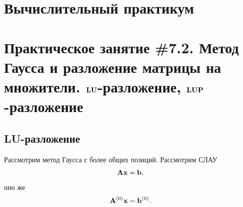 \documentclass[12pt]{article}
\begin{document}
    \begin{flushright}
    \end{flushright}
    \begin{flushright}
    \end{flushright}
    \section*{Вычислительный практикум}
    \section*{Практическое занятие \#7.2. Метод Гаусса и разложение матрицы на множители. $\bold{LU}$-раз\linebreak ложение, $\bold{LUP}$-разложение}

    \subsection*{LU-разложение}

    Рассмотрим метод Гаусса с более общих позиций. Рассмотрим СЛАУ
    \begin{equation}
        \bold{Ax}=\bold{b},
        \label{7.2:f1}
    \end{equation}
    оно же
    \begin{equation}
        \bold{A}^{\left(0\right)}\bold{x}=\bold{b}^{\left(0\right)}.
        \label{7.2:f2}
    \end{equation}
\end{document}
